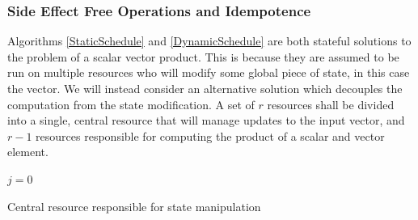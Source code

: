 \documentclass[12pt]{article}
\begin{document}
\subsubsection{Side Effect Free Operations and Idempotence}
Algorithms \ref{StaticSchedule} and \ref{DynamicSchedule} are both stateful solutions to the problem of a scalar vector product. This is because they are assumed to be run on multiple resources who will modify some global piece of state, in this case the vector.
\newline
\newline
We will instead consider an alternative solution which decouples the computation from the state modification. A set of $r$ resources shall be divided into a single, central resource that will manage updates to the input vector, and $r-1$ resources responsible for computing the product of a scalar and vector element.

\IncMargin{1em}
\begin{algorithm}[H]
 \BlankLine

 $j = 0$\;
 \caption{Central resource responsible for state manipulation}
 \label{StatelessProduct}
\end{algorithm}
\DecMargin{1em}
\medskip
\end{document}

